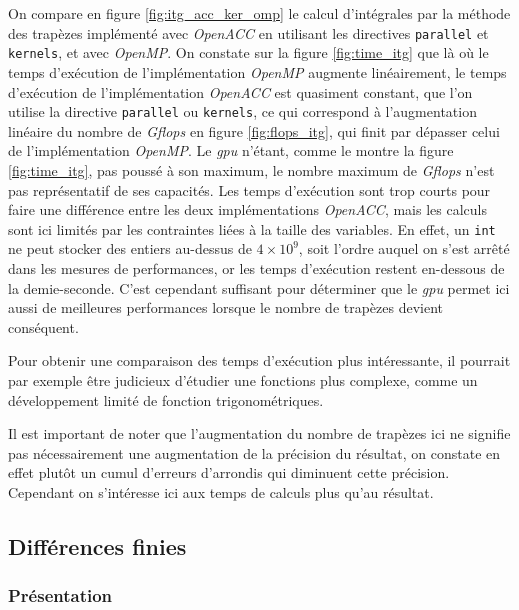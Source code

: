 \documentclass{article}
\begin{document}
On compare en figure \ref{fig:itg_acc_ker_omp} le calcul d'intégrales par la méthode des trapèzes implémenté avec \textit{OpenACC} en utilisant les directives \texttt{parallel} et \texttt{kernels}, et avec \textit{OpenMP}. On constate sur la figure \ref{fig:time_itg} que là où le temps d'exécution de l'implémentation \textit{OpenMP} augmente linéairement, le temps d'exécution de l'implémentation \textit{OpenACC} est quasiment constant, que l'on utilise la directive \texttt{parallel} ou \texttt{kernels}, ce qui correspond à l'augmentation linéaire du nombre de \textit{G\gls{flops}} en figure \ref{fig:flops_itg}, qui finit par dépasser celui de l'implémentation \textit{OpenMP}. Le \textit{\gls{gpu}} n'étant, comme le montre la figure \ref{fig:time_itg}, pas poussé à son maximum, le nombre maximum de \textit{G\gls{flops}} n'est pas représentatif de ses capacités. Les temps d'exécution sont trop courts pour faire une différence entre les deux implémentations \textit{OpenACC}, mais les calculs sont ici limités par les contraintes liées à la taille des variables. En effet, un \texttt{int} ne peut stocker des entiers au-dessus de $4 \times 10^{9}$, soit l'ordre auquel on s'est arrêté dans les mesures de performances, or les temps d'exécution restent en-dessous de la demie-seconde. C'est cependant suffisant pour déterminer que le \textit{\gls{gpu}} permet ici aussi de meilleures performances lorsque le nombre de trapèzes devient conséquent.

Pour obtenir une comparaison des temps d'exécution plus intéressante, il pourrait par exemple être judicieux d'étudier une fonctions plus complexe, comme un développement limité de fonction trigonométriques.

Il est important de noter que l'augmentation du nombre de trapèzes ici ne signifie pas nécessairement une augmentation de la précision du résultat, on constate en effet plutôt un cumul d'erreurs d'arrondis qui diminuent cette précision. Cependant on s'intéresse ici aux temps de calculs plus qu'au résultat.

\FloatBarrier

\subsection{Différences finies}

\subsubsection{Présentation}
\end{document}
